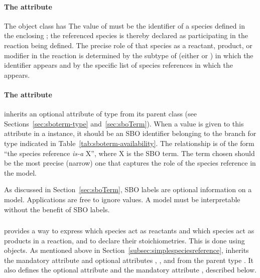 \paragraph{The  attribute}

The \SimpleSpeciesReference object class has   The value of  must be
the identifier of a species defined in the enclosing \Model; the
referenced species is thereby declared as participating in the
reaction being defined.  The precise role of that species as a
reactant, product, or modifier in the reaction is determined by
the subtype of \SimpleSpeciesReference (\ie either
\SpeciesReference or \ModifierSpeciesReference) in which the
identifier appears and by the specific list of species references
in which the \SpeciesReference appears.


\paragraph{The  attribute}
\label{sec:simplespeciesreference-sboterm}

\SimpleSpeciesReference inherits an optional 
attribute of type  from its parent class \SBase
(see Sections~\ref{sec:sboterm-type} and~\ref{sec:sboTerm}).  When
a value is given to this attribute in a \SimpleSpeciesReference
instance, it should be an SBO identifier belonging to the branch
for type \SimpleSpeciesReference indicated in
Table~\ref{tab:sboterm-availability}.  The relationship is of the
form ``the species reference \emph{is-a} X'', where X is the SBO
term.  The term chosen should be the most precise (narrow) one
that captures the role of the species reference in the model.

As discussed in Section~\ref{sec:sboTerm}, SBO labels are optional
information on a model.  Applications are free to ignore
 values.  A model must be interpretable without the
benefit of SBO labels.


\subsubsection{}
\label{subsec:speciesreference}

\Reaction provides a way to express which species act as reactants
and which species act as products in a reaction, and to declare
their stoichiometries.  This is done using \SpeciesReference
objects.  As mentioned above in
Section~\ref{subsec:simplespeciesreference}, \SpeciesReference
inherits the mandatory attribute  and optional
attributes , , and  from the
parent type \SimpleSpeciesReference.  It also defines the optional
attribute  and the mandatory attribute
, described below.


